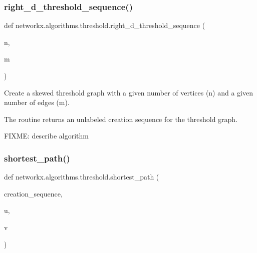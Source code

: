 \subsubsection{\texorpdfstring{right\+\_\+d\+\_\+threshold\+\_\+sequence()}{right\_d\_threshold\_sequence()}}
{\footnotesize\ttfamily def networkx.\+algorithms.\+threshold.\+right\+\_\+d\+\_\+threshold\+\_\+sequence (\begin{DoxyParamCaption}\item[{}]{n,  }\item[{}]{m }\end{DoxyParamCaption})}

\begin{DoxyVerb}Create a skewed threshold graph with a given number
of vertices (n) and a given number of edges (m).

The routine returns an unlabeled creation sequence
for the threshold graph.

FIXME: describe algorithm\end{DoxyVerb}
 \mbox{\label{namespacenetworkx_1_1algorithms_1_1threshold_aa5db00fe713433e44e8ad2c0e665218a}} 
\subsubsection{\texorpdfstring{shortest\+\_\+path()}{shortest\_path()}}
{\footnotesize\ttfamily def networkx.\+algorithms.\+threshold.\+shortest\+\_\+path (\begin{DoxyParamCaption}\item[{}]{creation\+\_\+sequence,  }\item[{}]{u,  }\item[{}]{v }\end{DoxyParamCaption})}

